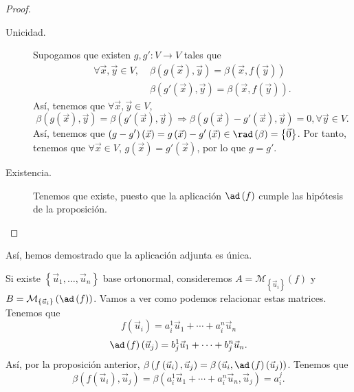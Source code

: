 \begin{proof}
\begin{description}
\item[Unicidad.] Supogamos que existen $\displaystyle g,g' : V \to V $ tales que 
	\[
	\begin{split}
		\forall \vec{x}, \vec{y} \in V, \; & \beta\left(g\left(\vec{x}\right), \vec{y}\right) = \beta\left(\vec{x}, f\left(\vec{y}\right)\right) \\
						   & \beta\left(g'\left(\vec{x}\right), \vec{y}\right)=\beta\left(\vec{x}, f\left(\vec{y}\right)\right).
	\end{split}
	\]
	Así, tenemos que $\displaystyle \forall \vec{x}, \vec{y} \in V $,
	\[ \beta\left(g\left(\vec{x}\right), \vec{y} \right) = \beta\left(g'\left(\vec{x}\right), \vec{y}\right) \Rightarrow \beta\left(g\left(\vec{x}\right)-g'\left(\vec{x}\right), \vec{y}\right) = 0, \forall \vec{y} \in V .\]
	Así, tenemos que $\displaystyle \left(g-g'\right)\left(\vec{x}\right) = g\left(\vec{x}\right)-g'\left(\vec{x}\right) \in \rad\left(\beta \right)= \left\{ \vec{0}\right\}  $. Por tanto, tenemos que $\displaystyle \forall \vec{x} \in V $, $\displaystyle g\left(\vec{x}\right) = g'\left(\vec{x}\right) $, por lo que $\displaystyle g = g' $.
\item[Existencia.] Tenemos que existe, puesto que la aplicación $\displaystyle \ad\left(f\right) $ cumple las hipótesis de la proposición.
\end{description}
\end{proof}
\begin{observation}
\normalfont Así, hemos demostrado que la aplicación adjunta es única.
\end{observation}
Si existe $\displaystyle \left\{ \vec{u}_{1}, \ldots, \vec{u}_{n}\right\}  $ base ortonormal, consideremos $\displaystyle A = \mathcal{M}_{ \left\{ \vec{u}_{i}\right\} }\left(f\right) $ y $\displaystyle B = \mathcal{M}_{ \left\{ \vec{u}_{i}\right\} }\left(\ad\left(f\right)\right) $. Vamos a ver como podemos relacionar estas matrices. Tenemos que
\[f\left(\vec{u}_{i}\right) = a^{1}_{i}\vec{u}_{1} + \cdots + a^{n}_{i}\vec{u}_{n} \]
\[ \ad\left(f\right)\left(\vec{u}_{j}\right) = b^{1}_{j}\vec{u}_{1} + \cdots + b^{n}_{j}\vec{u}_{n} .\]
Así, por la proposición anterior, $\displaystyle \beta\left(f\left(\vec{u}_{i}\right), \vec{u}_{j}\right) = \beta\left(\vec{u}_{i}, \ad\left(f\right)\left(\vec{u}_{j}\right)\right) $. Tenemos que
\[ \beta\left(f\left(\vec{u}_{i}\right),\vec{u}_{j}\right) =\beta\left(a^{1}_{i}\vec{u}_{1} + \cdots + a^{n}_{i}\vec{u}_{n}, \vec{u}_{j}\right) =a^{j}_{i} .\]
